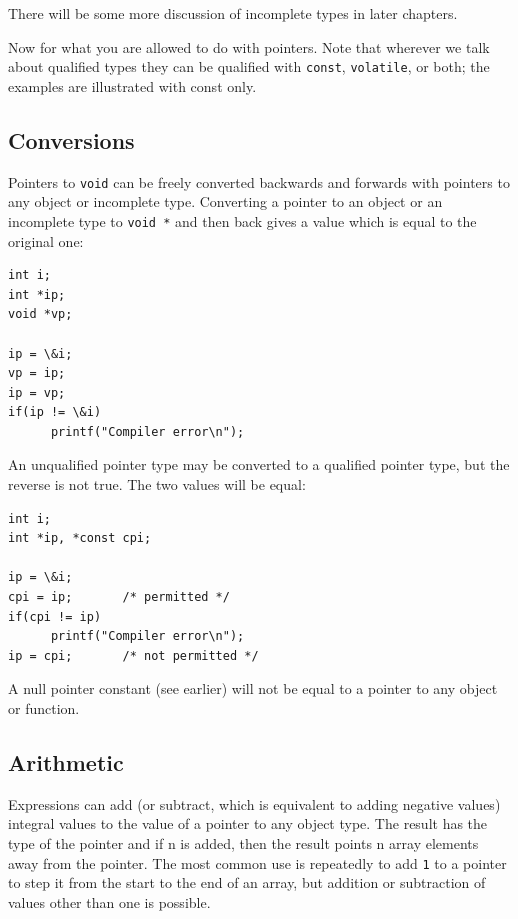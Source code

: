   There will be some more discussion of incomplete types in later
   chapters.


  Now for what you are allowed to do with pointers. Note that wherever we
   talk about qualified types they can be qualified with \texttt{const},
   \texttt{volatile}, or both; the examples are illustrated with const
   only.


  \subsection{Conversions}
   

   Pointers to \texttt{void} can be freely converted backwards and
    forwards with pointers to any object or incomplete type. Converting
    a pointer to an object or an incomplete type to \texttt{void *} and
    then back gives a value which is equal to the original one:


   \begin{Verbatim}
int i;
int *ip;
void *vp;

ip = \&i;
vp = ip;
ip = vp;
if(ip != \&i)
      printf("Compiler error\n");
\end{Verbatim}

   An unqualified pointer type may be converted to a qualified pointer
    type, but the reverse is not true. The two values will be equal:


   
   \begin{Verbatim}
int i;
int *ip, *const cpi;

ip = \&i;
cpi = ip;       /* permitted */
if(cpi != ip)
      printf("Compiler error\n");
ip = cpi;       /* not permitted */
\end{Verbatim}

   A null pointer constant (see earlier) will not be equal to a pointer
    to any object or function.


  

  \subsection{Arithmetic}
   

   Expressions can add (or subtract, which is equivalent to adding
    negative values) integral values to the value of a pointer to any object
    type. The result has the type of the pointer and if n is
    added, then the result points n array elements away from the
    pointer. The most common use is repeatedly to add \texttt{1} to
    a pointer to step it from the start to the end of an array, but addition
    or subtraction of values other than one is possible.



